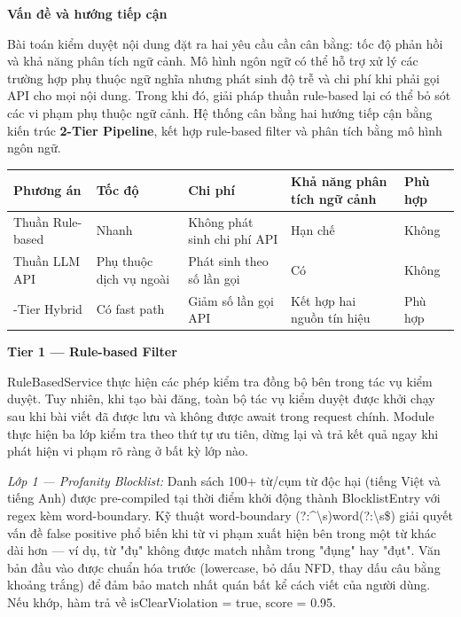 \textbf{Vấn đề và hướng tiếp cận}

Bài toán kiểm duyệt nội dung đặt ra hai yêu cầu cần cân bằng: tốc độ phản
hồi và khả năng phân tích ngữ cảnh. Mô hình ngôn ngữ có thể hỗ trợ xử lý
các trường hợp phụ thuộc ngữ nghĩa nhưng phát sinh độ trễ và chi phí khi
phải gọi API cho mọi nội dung. Trong khi đó, giải pháp thuần rule-based
lại có thể bỏ sót các vi phạm phụ thuộc ngữ cảnh. Hệ thống cân bằng hai
hướng tiếp cận bằng kiến trúc \textbf{2-Tier Pipeline}, kết hợp
rule-based filter và phân tích bằng mô hình ngôn ngữ.

{\def\LTcaptype{none} %
\begin{longtable}{
  |>{\centering\arraybackslash}p{}
  |>{\centering\arraybackslash}p{}
  |>{\centering\arraybackslash}p{}
  |>{\centering\arraybackslash}p{}
  |>{\centering\arraybackslash}p{}|}
\endhead
\hline
\endlastfoot
Phương án & Tốc độ & Chi phí & Khả năng phân tích ngữ cảnh & Phù hợp \\ \hline
Thuần Rule-based & Nhanh & Không phát sinh chi phí API & Hạn chế &
Không \\ \hline
Thuần LLM API & Phụ thuộc dịch vụ ngoài & Phát sinh theo số lần gọi &
Có & Không \\ \hline
2-Tier Hybrid & Có fast path & Giảm số lần gọi API & Kết hợp hai nguồn
tín hiệu & Phù hợp \\ \hline
\end{longtable}
}

\textbf{Tier 1 --- Rule-based Filter}

RuleBasedService thực hiện các phép kiểm tra đồng bộ bên trong tác vụ
kiểm duyệt. Tuy nhiên, khi tạo bài đăng, toàn bộ tác vụ kiểm duyệt được
khởi chạy sau khi bài viết đã được lưu và không được await trong request
chính. Module thực hiện ba lớp kiểm tra theo thứ tự ưu tiên, dừng lại và
trả kết quả ngay khi phát hiện vi phạm rõ ràng ở bất kỳ lớp nào.

\emph{Lớp 1 --- Profanity Blocklist:} Danh sách 100+ từ/cụm từ độc hại
(tiếng Việt và tiếng Anh) được pre-compiled tại thời điểm khởi động
thành BlocklistEntry với regex kèm word-boundary. Kỹ thuật word-boundary
(?:\^{}\textbar\textbackslash s)word(?:\textbackslash s\textbar\$) giải
quyết vấn đề false positive phổ biến khi từ vi phạm xuất hiện bên trong
một từ khác dài hơn --- ví dụ, từ "đụ" không được match nhầm trong
"đụng" hay "đụt". Văn bản đầu vào được chuẩn hóa trước (lowercase, bỏ
dấu NFD, thay dấu câu bằng khoảng trắng) để đảm bảo match nhất quán bất
kể cách viết của người dùng. Nếu khớp, hàm trả về isClearViolation =
true, score = 0.95.

